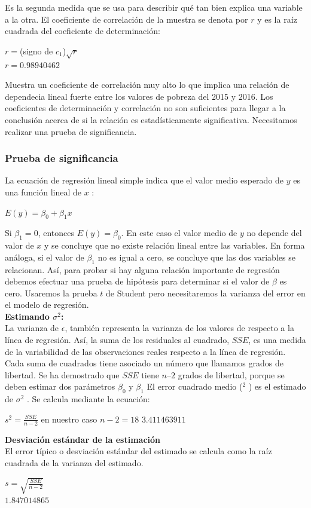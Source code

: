 \documentclass[twocolumn,twoside]{article}
\begin{document}
Es la segunda medida que se usa para describir qu\'e tan bien explica una variable a la otra. 
El coeficiente de correlaci\'on de la muestra se denota por $r$ y es la ra\'iz cuadrada del 
coeficiente de determinaci\'on:
\begin{center}
  $r=$(signo de $c_1$)$\sqrt{r}$\\
  $r=0.98940462$
\end{center}
Muestra un coeficiente de correlaci\'on muy alto lo que implica una relaci\'on de dependecia lineal 
fuerte entre los valores de pobreza del 2015 y 2016.
Los coeficientes de determinaci\'on y correlaci\'on no son suficientes para llegar a la conclusi\'on acerca
de si la relaci\'on es estad\'isticamente significativa. Necesitamos realizar una prueba de significancia.\\

\subsubsection{Prueba de significancia}

La ecuaci\'on de regresi\'on lineal simple indica que el valor medio esperado de $y$ es una funci\'on
lineal de $x$ :
\begin{center}
  $E(y)=\beta_0 + \beta_1x$ \\
\end{center}
Si $\beta_1 =0$, entonces $E(y)= \beta_0 $. En este caso el valor medio de $y$ no depende del valor de $x$ y se concluye
que no existe relaci\'on lineal entre las variables. En forma an\'aloga, si el valor de $\beta_1$ no es igual a cero,
se concluye que las dos variables se relacionan. As\'i, para probar si hay alguna relaci\'on importante
de regresi\'on debemos efectuar una prueba de hip\'otesis para determinar si el valor de $\beta$ es cero.
Usaremos la prueba $t$ de Student pero necesitaremos la varianza del error en el modelo de regresi\'on.\\
\textbf{Estimando $\sigma^2$:}\\
La varianza de $\epsilon$, tambi\'en representa la varianza de los valores de respecto a la l\'inea de regresi\'on.
As\'i, la suma de los residuales al cuadrado, $SSE$, es una medida de la variabilidad de las observaciones
reales respecto a la l\'inea de regresi\'on. Cada suma de cuadrados tiene asociado un n\'umero que llamamos grados
de libertad. Se ha demostrado
que $SSE$ tiene $n–2$ grados de libertad, porque se deben estimar dos par\'ametros $\beta_0$ y $\beta_1$
El error cuadrado medio ($^2$ ) es el estimado de $\sigma^2$ .
Se calcula mediante la ecuaci\'on:
\begin{center}
  $s^2=\frac{SSE}{n-2}$ en nuestro caso $n-2=18$
  $3.411463911 $
\end{center}
\textbf{Desviaci\'on est\'andar de la estimaci\'on}\\
El error t\'ipico o desviaci\'on est\'andar del estimado se calcula como la 
ra\'iz cuadrada de la varianza del estimado.
\begin{center}
  $s=\sqrt{\frac{SSE}{n-2}}$\\
  $1.847014865 $
\end{center}
\end{document}
